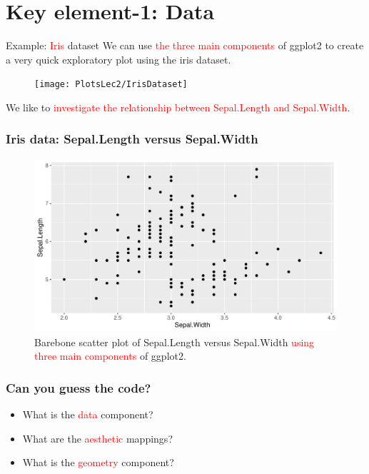 \documentclass{beamer}
\begin{document}
\section{Key element-1: Data}
\begin{frame}{Example: \textcolor{red}{Iris} dataset}
We can use \textcolor{red}{the three main components} of ggplot2 to create a very quick exploratory plot using the iris dataset.
\begin{figure}
\texttt{[image: PlotsLec2/IrisDataset]}
\end{figure}
We like to \textcolor{red}{investigate the relationship between Sepal.Length and Sepal.Width}.
\end{frame}

\begin{frame}\frametitle{Iris data: Sepal.Length versus Sepal.Width}
\begin{figure}
\includegraphics[width=0.99\linewidth]{PlotsLec2/Scatter1}
\caption{{\small Barebone scatter plot of Sepal.Length versus Sepal.Width \textcolor{red}{using three main components} of ggplot2.}}
\end{figure}
\end{frame}

\begin{frame}\frametitle{Can you guess the code?}
\Large
\begin{itemize}
\item What is the \textcolor{red}{data} component?
\vspace{0.3in}
\item What are the \textcolor{red}{aesthetic} mappings?
\vspace{0.3in}
\item What is the \textcolor{red}{geometry} component?
\end{itemize}
\end{frame}
\end{document}
